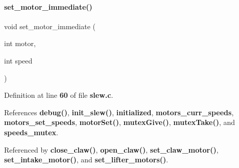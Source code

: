 \paragraph{set\+\_\+motor\+\_\+immediate()}
{\footnotesize\ttfamily void set\+\_\+motor\+\_\+immediate (\begin{DoxyParamCaption}\item[{int}]{motor,  }\item[{int}]{speed }\end{DoxyParamCaption})}



Definition at line \textbf{ 60} of file \textbf{ slew.\+c}.



References \textbf{ debug()}, \textbf{ init\+\_\+slew()}, \textbf{ initialized}, \textbf{ motors\+\_\+curr\+\_\+speeds}, \textbf{ motors\+\_\+set\+\_\+speeds}, \textbf{ motor\+Set()}, \textbf{ mutex\+Give()}, \textbf{ mutex\+Take()}, and \textbf{ speeds\+\_\+mutex}.



Referenced by \textbf{ close\+\_\+claw()}, \textbf{ open\+\_\+claw()}, \textbf{ set\+\_\+claw\+\_\+motor()}, \textbf{ set\+\_\+intake\+\_\+motor()}, and \textbf{ set\+\_\+lifter\+\_\+motors()}.


